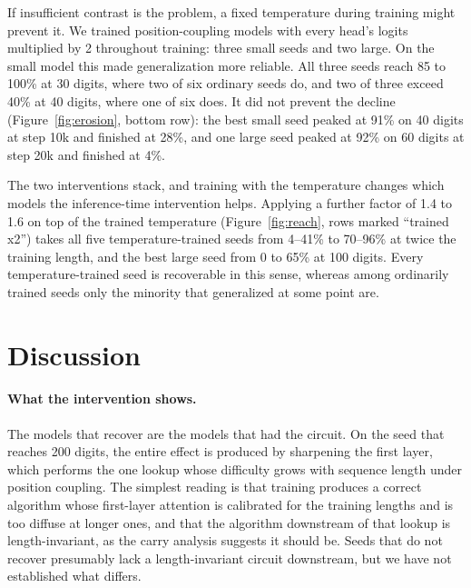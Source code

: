 \documentclass{article}
\begin{document}
If insufficient contrast is the problem, a fixed temperature during training might prevent it. We trained position-coupling models with every head's logits multiplied by 2 throughout training: three small seeds and two large. On the small model this made generalization more reliable. All three seeds reach 85 to 100\% at 30 digits, where two of six ordinary seeds do, and two of three exceed 40\% at 40 digits, where one of six does. It did not prevent the decline (Figure~\ref{fig:erosion}, bottom row): the best small seed peaked at 91\% on 40 digits at step 10k and finished at 28\%, and one large seed peaked at 92\% on 60 digits at step 20k and finished at 4\%.

The two interventions stack, and training with the temperature changes which models the inference-time intervention helps. Applying a further factor of 1.4 to 1.6 on top of the trained temperature (Figure~\ref{fig:reach}, rows marked ``trained x2'') takes all five temperature-trained seeds from 4--41\% to 70--96\% at twice the training length, and the best large seed from 0 to 65\% at 100 digits. Every temperature-trained seed is recoverable in this sense, whereas among ordinarily trained seeds only the minority that generalized at some point are.

\section{Discussion}
\label{sec:discussion}

\paragraph{What the intervention shows.} The models that recover are the models that had the circuit. On the seed that reaches 200 digits, the entire effect is produced by sharpening the first layer, which performs the one lookup whose difficulty grows with sequence length under position coupling. The simplest reading is that training produces a correct algorithm whose first-layer attention is calibrated for the training lengths and is too diffuse at longer ones, and that the algorithm downstream of that lookup is length-invariant, as the carry analysis suggests it should be. Seeds that do not recover presumably lack a length-invariant circuit downstream, but we have not established what differs.
\end{document}
